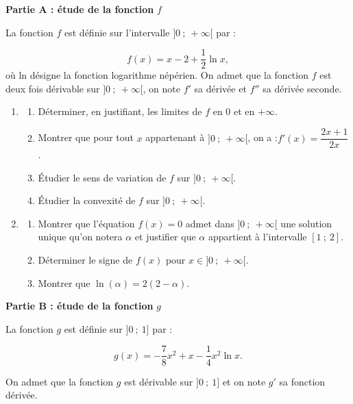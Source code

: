 \medskip

\textbf{Partie A : étude de la fonction }\boldmath$f$\unboldmath

\medskip

La fonction $f$ est définie sur l'intervalle $]0 ~;~+\infty[$ par : 

\[f(x)=x-2+\dfrac{1}{2} \ln x,\]
 où ln désigne la fonction logarithme népérien. On admet que la fonction $f$ est deux fois dérivable sur $] 0 ~;~ +\infty[$, on note $f'$ sa dérivée et $f''$ sa dérivée seconde.

\begin{enumerate}
	\item \begin{enumerate}
		\item Déterminer, en justifiant, les limites de $f$ en 0 et en $+\infty$.

		\item Montrer que pour tout $x$ appartenant à $] 0 ~;~+\infty[$, on a :\quad $f'(x)=\dfrac{2x + 1}{2x}$.

		\item Étudier le sens de variation de $f$ sur $] 0 ~;~+\infty[$.

		\item Étudier la convexité de $f$ sur $] 0~;~ +\infty[$.
	\end{enumerate}

	\item \begin{enumerate}
		\item Montrer que l'équation $f(x)=0$ admet dans $] 0 ~;~ +\infty[$ une solution unique qu'on notera $\alpha$ et justifier que $\alpha$ appartient à l'intervalle $[1~;~2]$.

		\item Déterminer le signe de $f(x)$ pour $x \in] 0 ~;~ +\infty[$.

		\item Montrer que $\ln (\alpha)=2(2-\alpha)$.
	\end{enumerate}
\end{enumerate}

\medskip

\textbf{Partie B : étude de la fonction }\boldmath $g$\unboldmath

\smallskip

La fonction $g$ est définie sur $] 0~;~1]$ par :

\[g(x) = -\dfrac{7}{8} x^{2}+ x - \dfrac{1}{4} x^{2} \ln x.\]

On admet que la fonction $g$ est dérivable sur $] 0~;~1]$ et on note $g'$ sa fonction dérivée.

